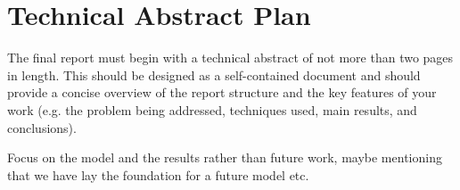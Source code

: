 \chapter*{Technical Abstract Plan}

The final report must begin with a technical abstract of not more than two pages in length. This should be designed as a self-contained document and should provide a concise overview of the report structure and the key features of your work (e.g. the problem being addressed, techniques used, main results, and conclusions).

Focus on the model and the results rather than future work, maybe mentioning that we have lay the foundation for a future model etc.
